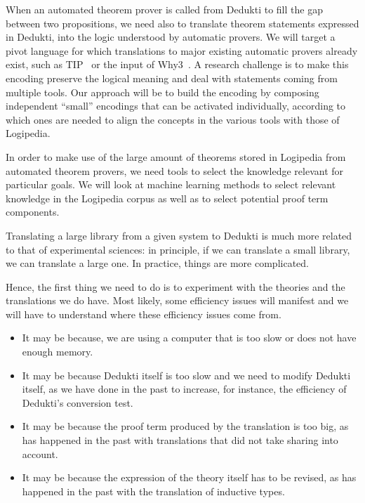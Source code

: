When an automated theorem prover is called from Dedukti to fill the
gap between two propositions, we need also to translate theorem
statements expressed in Dedukti, into the logic understood by
automatic provers. We will target a pivot language for which
translations to major existing automatic provers already exist, such
as TIP~\cite{DBLP:conf/mkm/ClaessenJRS15} or the input of
Why3~\cite{DBLP:conf/esop/FilliatreP13}. A research challenge is to
make this encoding preserve the logical meaning and deal with
statements coming from multiple tools. Our approach will be to build
the encoding by composing independent ``small'' encodings that can be
activated individually, according to which ones are needed to align
the concepts in the various tools with those of Logipedia.

In order to make use of the large amount of theorems stored in
Logipedia from automated theorem provers, we need tools to select the
knowledge relevant for particular goals. We will look at machine
learning methods to select relevant knowledge in the Logipedia corpus
as well as to select potential proof term components.


Translating a large library from a given system to Dedukti is much
more related to that of experimental sciences: in principle, if we can
translate a small library, we can translate a large one. In practice,
things are more complicated.

Hence, the first thing we need to do is to experiment with the
theories and the translations we do have. Most likely, some efficiency
issues will manifest and we will have to understand where these
efficiency issues come from.

\begin{itemize}
\item It may be because, we are using a computer that is too slow or
  does not have enough memory.
\item It may be because Dedukti itself is too slow and we need to modify
  Dedukti itself, as we have done in the past to increase, for instance,
  the efficiency of Dedukti's conversion test.
\item It may be because the proof term produced by the translation is
  too big, as has happened in the past with translations that did not
  take sharing into account.
\item It may be because the expression of the theory itself has to be
  revised, as has happened in the past with the translation of
  inductive types.
\end{itemize}

